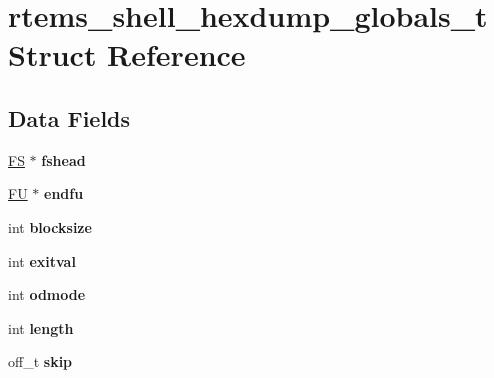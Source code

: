 \hypertarget{structrtems__shell__hexdump__globals__t}{}\section{rtems\+\_\+shell\+\_\+hexdump\+\_\+globals\+\_\+t Struct Reference}
\label{structrtems__shell__hexdump__globals__t}
\subsection*{Data Fields}
\begin{DoxyCompactItemize}
\item 
\mbox{\label{structrtems__shell__hexdump__globals__t_ad62a85e49ff8431cd02c05ae8a3ac7f8}} 
\mbox{\hyperlink{struct__fs}{FS}} $\ast$ {\bfseries fshead}
\item 
\mbox{\label{structrtems__shell__hexdump__globals__t_a025f71476d76839687df243b998c8294}} 
\mbox{\hyperlink{struct__fu}{FU}} $\ast$ {\bfseries endfu}
\item 
\mbox{\label{structrtems__shell__hexdump__globals__t_a039fab4cadedadd4fa3f78fcfd1f4e60}} 
int {\bfseries blocksize}
\item 
\mbox{\label{structrtems__shell__hexdump__globals__t_af5ab4e33c2fd19a4713755ad61de9dc3}} 
int {\bfseries exitval}
\item 
\mbox{\label{structrtems__shell__hexdump__globals__t_a7a67207bcc99ca1f8d752c7ac6bccab7}} 
int {\bfseries odmode}
\item 
\mbox{\label{structrtems__shell__hexdump__globals__t_ad5b55c2557f396d0e7634bb661d036b6}} 
int {\bfseries length}
\item 
\mbox{\label{structrtems__shell__hexdump__globals__t_a1b2924757929f25e2ae7d6c9f05e46cf}} 
off\+\_\+t {\bfseries skip}
\item 
\mbox{\label{structrtems__shell__hexdump__globals__t_a1b9e41c9ce6dad3ec335436eb2a76a0f}} 

\end{DoxyCompactItemize}
